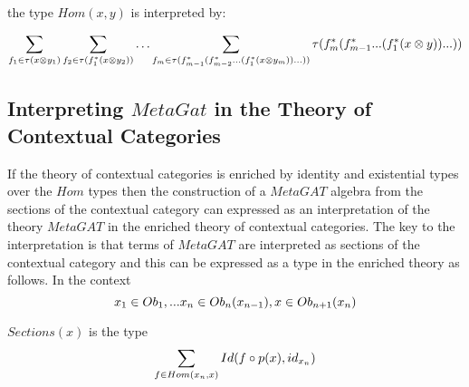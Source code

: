 \documentclass[10pt,a4paper]{article}
\begin{document}
\noindent the type $Hom(x,y)$ is interpreted by:

\begin{equation}
\sum_{f_1 \in \tau(x \otimes y_1)}
\sum_{f_2 \in \tau(f_1 ^* (x \otimes y_2))}
\hdots
\sum_{f_m \in \tau(f_{m-1} ^* (f_{m-2}^*...(f_1 ^* (x \otimes y_m))...))}
\tau(f_{m} ^* (f_{m-1} ^* ...(f_1 ^* (x \otimes y))...))
\end{equation}

\subsection {Interpreting $MetaGat$ in the Theory of Contextual Categories}
\noindent If the theory of contextual categories is enriched by identity and existential types over the $Hom$ types then the construction of a $MetaGAT$ algebra from the sections of the contextual category can expressed as an interpretation of the theory $MetaGAT$ in the enriched theory of contextual categories. The key to the interpretation is that terms of $MetaGAT$ are interpreted as sections of the contextual category and this
can be expressed as a type in the enriched theory as follows.
\noindent In the context
\begin{displaymath}
x_1 \in Ob_1,...x_n \in Ob_n(x_{n-1}),x \in Ob_{n+1}(x_n)
\end{displaymath}

\noindent $Sections(x)$ is the type
\begin{displaymath}
\sum_{f \in Hom(x_n,x)}Id(f \circ p(x),id_{x_n})
\end{displaymath}


\end{document}
